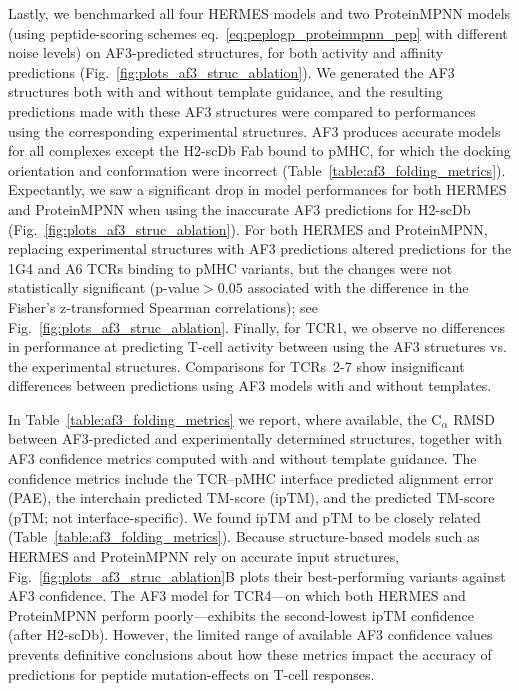 Lastly, we benchmarked all four HERMES models and two ProteinMPNN models (using peptide-scoring
schemes eq.~\ref{eq:peplogp_proteinmpnn_pep} with different noise levels) on AF3-predicted
structures, for both activity and affinity predictions (Fig.~\ref{fig:plots_af3_struc_ablation}). We
generated the AF3 structures both with and without template guidance, and the resulting predictions
made with these AF3 structures were compared to performances using the corresponding experimental
structures. AF3 produces accurate models for all complexes except the H2-scDb Fab bound to pMHC, for
which the docking orientation and conformation were incorrect
(Table~\ref{table:af3_folding_metrics}). Expectantly, we saw a significant drop in model
performances for both HERMES and ProteinMPNN when using the inaccurate AF3 predictions for H2-scDb
(Fig.~\ref{fig:plots_af3_struc_ablation}). For both HERMES and ProteinMPNN, replacing experimental
structures with AF3 predictions altered predictions for the 1G4 and A6 TCRs binding to pMHC
variants, but the changes were not statistically significant (p-value$>0.05$ associated with the
difference in the Fisher's z-transformed Spearman correlations); see
Fig.~\ref{fig:plots_af3_struc_ablation}. Finally, for TCR1, we observe no differences in performance
at predicting T-cell activity between using the AF3 structures vs. the experimental structures.
Comparisons for TCRs~2-7 show insignificant differences between predictions using AF3 models with
and without templates.

In Table~\ref{table:af3_folding_metrics} we report, where available, the C$_\alpha$ RMSD between
AF3-predicted and experimentally determined structures, together with AF3 confidence metrics
computed with and without template guidance. The confidence metrics include the TCR–pMHC interface
predicted alignment error (PAE), the interchain predicted TM-score (ipTM), and the predicted
TM-score (pTM; not interface-specific). We found ipTM and pTM to be closely related
(Table~\ref{table:af3_folding_metrics}). Because structure-based models such as HERMES and
ProteinMPNN rely on accurate input structures, Fig.~\ref{fig:plots_af3_struc_ablation}B plots their
best-performing variants against AF3 confidence. The AF3 model for TCR4—on which both HERMES and
ProteinMPNN perform poorly—exhibits the second-lowest ipTM confidence (after H2-scDb). However, the
limited range of available AF3 confidence values prevents definitive conclusions about how these
metrics impact
the accuracy of predictions for peptide mutation-effects on T-cell responses.
\\

